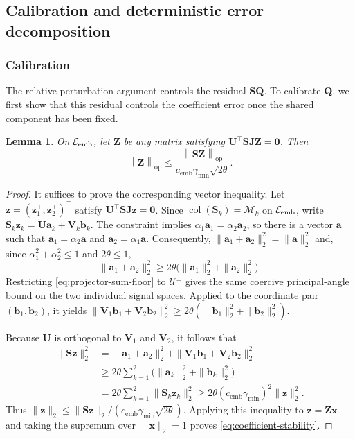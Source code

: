 \documentclass[11pt]{article}
\newtheorem{lemma}{Lemma}
\newcommand{\trans}{\top}
\DeclareMathOperator{\col}{col}
\newcommand{\opn}[1]{\left\lVert #1\right\rVert_{\mathrm{op}}}
\newcommand{\cU}{\mathcal{U}}
\newcommand{\cM}{\mathcal{M}}
\newcommand{\cE}{\mathcal{E}}
\newcommand{\bze}{\bm{0}}
\newcommand{\gmin}{\gamma_{\min}}
\newcommand{\cemb}{c_{\mathrm{emb}}}
\begin{document}
\subsection{Calibration and deterministic error decomposition}

\subsubsection{Calibration}

The relative perturbation argument controls the residual
$\bm S\bm Q$. To calibrate $\bm Q$, we first show that this residual
controls the coefficient error once the shared component has been fixed.

\begin{lemma}
\label{lem:coefficient-stability}
On $\cE_{\rm emb}$, let $\bm Z$ be any matrix satisfying
$\bm U^\trans\bm S\bm J\bm Z=\bze$. Then
\begin{equation}
\label{eq:coefficient-stability}
  \opn{\bm Z}
  \le
  \frac{\opn{\bm S\bm Z}}
       {\cemb\gmin\sqrt{2\theta}}.
\end{equation}
\end{lemma}

\begin{proof}
It suffices to prove the corresponding vector inequality. Let
$\bm z=(\bm z_1^\trans,\bm z_2^\trans)^\trans$ satisfy
$\bm U^\trans\bm S\bm J\bm z=\bze$. Since
$\col(\bm S_k)=\cM_k$ on $\cE_{\rm emb}$, write
$\bm S_k\bm z_k=\bm U\bm a_k+\bm V_k\bm b_k$. The constraint implies
$\alpha_1\bm a_1=\alpha_2\bm a_2$, so there is a vector $\bm a$ such that
$\bm a_1=\alpha_2\bm a$ and $\bm a_2=\alpha_1\bm a$. Consequently,
$\|\bm a_1+\bm a_2\|_2^2=\|\bm a\|_2^2$ and, since
$\alpha_1^2+\alpha_2^2\le 1$ and $2\theta\le 1$,
\[
  \|\bm a_1+\bm a_2\|_2^2
  \ge
  2\theta
  \bigl(
    \|\bm a_1\|_2^2+\|\bm a_2\|_2^2
  \bigr).
\]
Restricting \cref{eq:projector-sum-floor} to $\cU^\perp$ gives the same
coercive principal-angle bound on the two individual signal spaces. Applied
to the coordinate pair $(\bm b_1,\bm b_2)$, it yields
$\|\bm V_1\bm b_1+\bm V_2\bm b_2\|_2^2
\ge2\theta(\|\bm b_1\|_2^2+\|\bm b_2\|_2^2)$.


Because $\bm U$ is orthogonal to $\bm V_1$ and $\bm V_2$, it follows that
\begin{align*}
  \|\bm S\bm z\|_2^2
  &=
  \|\bm a_1+\bm a_2\|_2^2
  +
  \|\bm V_1\bm b_1+\bm V_2\bm b_2\|_2^2 \\
  &\ge
  2\theta
  \sum_{k=1}^2
  \bigl(
    \|\bm a_k\|_2^2+\|\bm b_k\|_2^2
  \bigr) \\
  &=
  2\theta
  \sum_{k=1}^2
  \|\bm S_k\bm z_k\|_2^2
  \ge
  2\theta(\cemb\gmin)^2\|\bm z\|_2^2.
\end{align*}
Thus
$\|\bm z\|_2
\le
\|\bm S\bm z\|_2/(\cemb\gmin\sqrt{2\theta})$.
Applying this inequality to $\bm z=\bm Z\bm x$ and taking the supremum
over $\|\bm x\|_2=1$ proves \cref{eq:coefficient-stability}.
\end{proof}
\end{document}

